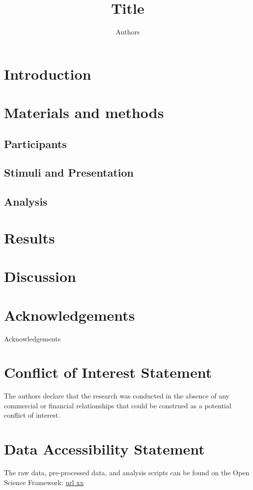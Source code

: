 \documentclass[man,12pt]{apa6} %
\title{Title}
\author{Authors}
\affiliation{Affiliation}
\begin{document}
\maketitle
\linenumbers %


\section{Introduction}

\section{Materials and methods} %
\subsection{Participants}
\subsection{Stimuli and Presentation}
\subsection{Analysis}

\section{Results}

\section{Discussion}




\section*{Acknowledgements}
Acknowledgements

\section*{Conflict of Interest Statement}

The authors declare that the research was conducted in the absence of any commercial or financial relationships that could be construed as a potential conflict of interest.



\section*{Data Accessibility Statement}
The raw data, pre-processed data, and analysis scripts can be found on the Open Science Framework: \url{url xx}



\end{document}
